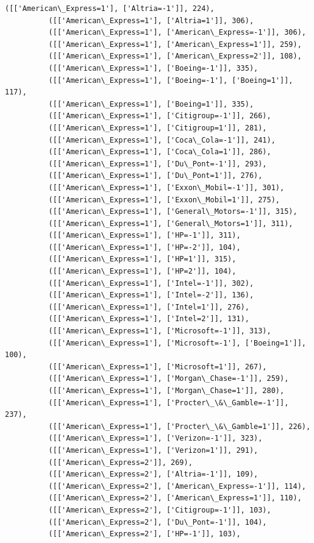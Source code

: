 \documentclass[11pt]{article}
\begin{document}
\begin{Verbatim}[commandchars=\\\{\}]
          ([['American\_Express=1'], ['Altria=-1']], 224),
          ([['American\_Express=1'], ['Altria=1']], 306),
          ([['American\_Express=1'], ['American\_Express=-1']], 306),
          ([['American\_Express=1'], ['American\_Express=1']], 259),
          ([['American\_Express=1'], ['American\_Express=2']], 108),
          ([['American\_Express=1'], ['Boeing=-1']], 335),
          ([['American\_Express=1'], ['Boeing=-1'], ['Boeing=1']], 117),
          ([['American\_Express=1'], ['Boeing=1']], 335),
          ([['American\_Express=1'], ['Citigroup=-1']], 266),
          ([['American\_Express=1'], ['Citigroup=1']], 281),
          ([['American\_Express=1'], ['Coca\_Cola=-1']], 241),
          ([['American\_Express=1'], ['Coca\_Cola=1']], 286),
          ([['American\_Express=1'], ['Du\_Pont=-1']], 293),
          ([['American\_Express=1'], ['Du\_Pont=1']], 276),
          ([['American\_Express=1'], ['Exxon\_Mobil=-1']], 301),
          ([['American\_Express=1'], ['Exxon\_Mobil=1']], 275),
          ([['American\_Express=1'], ['General\_Motors=-1']], 315),
          ([['American\_Express=1'], ['General\_Motors=1']], 311),
          ([['American\_Express=1'], ['HP=-1']], 311),
          ([['American\_Express=1'], ['HP=-2']], 104),
          ([['American\_Express=1'], ['HP=1']], 315),
          ([['American\_Express=1'], ['HP=2']], 104),
          ([['American\_Express=1'], ['Intel=-1']], 302),
          ([['American\_Express=1'], ['Intel=-2']], 136),
          ([['American\_Express=1'], ['Intel=1']], 276),
          ([['American\_Express=1'], ['Intel=2']], 131),
          ([['American\_Express=1'], ['Microsoft=-1']], 313),
          ([['American\_Express=1'], ['Microsoft=-1'], ['Boeing=1']], 100),
          ([['American\_Express=1'], ['Microsoft=1']], 267),
          ([['American\_Express=1'], ['Morgan\_Chase=-1']], 259),
          ([['American\_Express=1'], ['Morgan\_Chase=1']], 280),
          ([['American\_Express=1'], ['Procter\_\&\_Gamble=-1']], 237),
          ([['American\_Express=1'], ['Procter\_\&\_Gamble=1']], 226),
          ([['American\_Express=1'], ['Verizon=-1']], 323),
          ([['American\_Express=1'], ['Verizon=1']], 291),
          ([['American\_Express=2']], 269),
          ([['American\_Express=2'], ['Altria=-1']], 109),
          ([['American\_Express=2'], ['American\_Express=-1']], 114),
          ([['American\_Express=2'], ['American\_Express=1']], 110),
          ([['American\_Express=2'], ['Citigroup=-1']], 103),
          ([['American\_Express=2'], ['Du\_Pont=-1']], 104),
          ([['American\_Express=2'], ['HP=-1']], 103),

\end{Verbatim}
\end{document}
